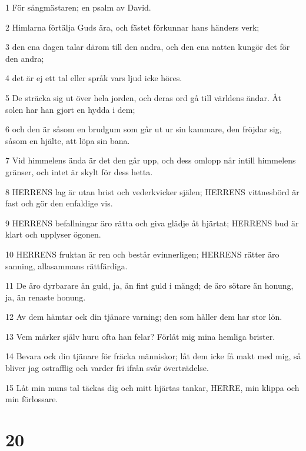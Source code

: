 \par 1 För sångmästaren; en psalm av David.
\par 2 Himlarna förtälja Guds ära, och fästet förkunnar hans händers verk;
\par 3 den ena dagen talar därom till den andra, och den ena natten kungör det för den andra;
\par 4 det är ej ett tal eller språk vars ljud icke höres.
\par 5 De sträcka sig ut över hela jorden, och deras ord gå till världens ändar. Åt solen har han gjort en hydda i dem;
\par 6 och den är såsom en brudgum som går ut ur sin kammare, den fröjdar sig, såsom en hjälte, att löpa sin bana.
\par 7 Vid himmelens ända är det den går upp, och dess omlopp når intill himmelens gränser, och intet är skylt för dess hetta.
\par 8 HERRENS lag är utan brist och vederkvicker själen; HERRENS vittnesbörd är fast och gör den enfaldige vis.
\par 9 HERRENS befallningar äro rätta och giva glädje åt hjärtat; HERRENS bud är klart och upplyser ögonen.
\par 10 HERRENS fruktan är ren och består evinnerligen; HERRENS rätter äro sanning, allasammans rättfärdiga.
\par 11 De äro dyrbarare än guld, ja, än fint guld i mängd; de äro sötare än honung, ja, än renaste honung.
\par 12 Av dem hämtar ock din tjänare varning; den som håller dem har stor lön.
\par 13 Vem märker själv huru ofta han felar? Förlåt mig mina hemliga brister.
\par 14 Bevara ock din tjänare för fräcka människor; låt dem icke få makt med mig, så bliver jag ostrafflig och varder fri ifrån svår överträdelse.
\par 15 Låt min muns tal täckas dig och mitt hjärtas tankar, HERRE, min klippa och min förlossare.

\chapter{20}

